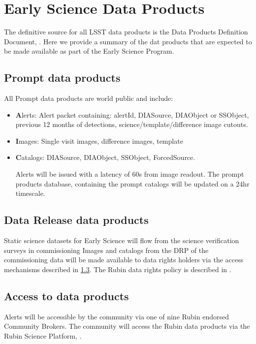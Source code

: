 \section{Early Science Data Products} 
\label{sec:data}

The definitive source for all LSST data products is the Data Products Definition Document, \citep{LSE-163}.
Here we provide a summary of the dat products that are expected to be made available as part of the Early Science Program. 

\subsection{Prompt data products}
All Prompt data products are world public and include: 
\begin{itemize}
\item {\textbf Alerts:}  Alert packet containing: alertId, DIASource, DIAObject or SSObject,  previous 12 months of detections,  science/template/difference image cutouts. 
\item {\textbf Images:	} Single visit images, difference images, template
\item {\textbf Catalogs:} DIASource, DIAObject, SSObject, ForcedSource.

Alerts will be issued with a latency of 60s from image readout. 
The prompt products database, containing the prompt catalogs will be updated on a 24hr timescale. 

\end{itemize}

\subsection{Data Release data products}
Static science datasets for Early Science will flow from the science verification surveys in commissioning
Images and catalogs from the DRP of the commissioning data will be made available to data rights holders via the access mechanisms described in \ref{ssec:dataaccess}.
The Rubin data rights policy is described in  \cite{RDO-013}.


\subsection{Access to \es data products}\label{ssec:dataaccess}
Alerts will be accessible by the community via one of nine Rubin endorsed Community Brokers. 
The community will access the Rubin data products via the Rubin Science Platform, \citep{LSE-319}.


